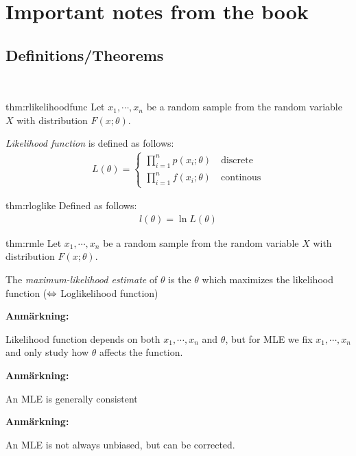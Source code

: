\section{Important notes from the book}\par
\subsection{Definitions/Theorems}\hfill\\\par
\par\bigskip
\begin{theo}{thm:rlikelihoodfunc}
  Let $x_1,\cdots,x_n$ be a random sample from the random variable $X$ with distribution $F(x;\theta)$.\par
  \noindent\textit{Likelihood function} is defined as follows:
  \begin{equation*}
    \begin{gathered}
      L(\theta) = \begin{cases}\prod_{i=1}^{n}p(x_i;\theta)\quad\text{discrete}\\\prod_{i=1}^{n}f(x_i;\theta)\quad\text{continous}\end{cases}
    \end{gathered}
  \end{equation*}
\end{theo}
\par\bigskip
\begin{theo}[Loglikelihood]{thm:rloglike}
  Defined as follows:
  \begin{equation*}
    \begin{gathered}
      l(\theta) = \ln{L(\theta)}
    \end{gathered}
  \end{equation*}
\end{theo}
\par\bigskip
\begin{theo}[MLE]{thm:rmle}
  Let $x_1,\cdots,x_n$ be a random sample from the random variable $X$ with distribution $F(x;\theta)$.
  \par\bigskip
  \noindent The \textit{maximum-likelihood estimate} of $\theta$ is the $\theta$ which maximizes the likelihood function ($\Leftrightarrow$ Loglikelihood function)
\end{theo}
\par\bigskip
\noindent\textbf{Anmärkning:}\par
\noindent Likelihood function depends on both $x_1,\cdots,x_n$ and $\theta$, but for MLE we fix $x_1,\cdots,x_n$ and only study how $\theta$ affects the function.
\par\bigskip
\noindent\textbf{Anmärkning:}\par
\noindent An MLE is generally consistent
\par\bigskip
\noindent\textbf{Anmärkning:}\par
\noindent An MLE is not always unbiased, but can be corrected.


